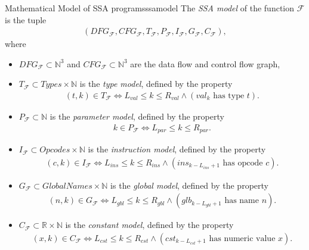 \begin{definition}{Mathematical Model of SSA programs}{ssamodel}
    The {\em SSA model} of the function $\mathcal F$ is the tuple
    \begin{align*}
        (DFG_\mathcal{F},
         CFG_\mathcal{F},
         T_\mathcal{F},
         P_\mathcal{F},
         I_\mathcal{F},
         G_\mathcal{F},
         C_\mathcal{F}),
    \end{align*}
    where
    \begin{itemize}
    \item $DFG_\mathcal{F}\subset\mathbb N^3$ and
          $CFG_\mathcal{F}\subset\mathbb N^3$ are the data flow and control
          flow graph,
    \item $T_\mathcal F\subset Types\times\mathbb N$ is the {\it type model},
          defined by the property
          \begin{align*}
              (t,k)\in T_\mathcal F\iff L_{val}\leq k\leq R_{val}
                  \mathrel{\land}(val_k\text{ has type }t).
          \end{align*}
    \item $P_\mathcal F\subset\mathbb N$ is the {\it parameter model}, defined
          by the property
          \begin{align*}
              k\in P_\mathcal F\iff L_{par}\leq k\leq R_{par}.
          \end{align*}
    \item $I_\mathcal F\subset Opcodes\times \mathbb N$ is the
          {\it instruction model}, defined by the property
          \begin{align*}
              (c,k)\in I_\mathcal F\iff L_{ins}\leq k\leq R_{ins}
                  \mathrel{\land}(ins_{k-L_{ins}+1}\text{ has opcode }c).
          \end{align*}
    \item $G_\mathcal F\subset GlobalNames\times\mathbb N$ is the
          {\it global model}, defined by the property
          \begin{align*}
              (n,k)\in G_\mathcal F\iff L_{gbl}\leq k\leq R_{gbl}
                  \mathrel{\land}(glb_{k-L_{gbl}+1}\text{ has name }n).
          \end{align*}
    \item $C_\mathcal F\subset\mathbb R\times\mathbb N$ is the
          {\it constant model}, defined by the property
          \begin{align*}
              (x,k)\in C_\mathcal F\iff L_{cst}\leq k\leq R_{cst}
                  \mathrel{\land}(cst_{k-L_{cst}+1}\text{ has numeric value }x).
          \end{align*}
    \end{itemize}
\end{definition}


